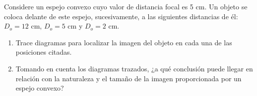 
Considere un espejo convexo cuyo valor de distancia focal es 5 cm. Un objeto se coloca delante de este espejo, sucesivamente, a las siguientes distancias de él: $D_{o} = 12 \text{ cm}$, $D_{o}= 5 \text{ cm}$ y $D_{o} = 2 \text{ cm}$.
\begin{enumerate}
    \item Trace diagramas para localizar la imagen del objeto en cada una de las posiciones citadas.
    \item Tomando en cuenta los diagramas trazados, ¿a qué conclusión puede llegar en relación con la naturaleza y el tamaño de la imagen proporcionada por un espejo convexo?
\end{enumerate}